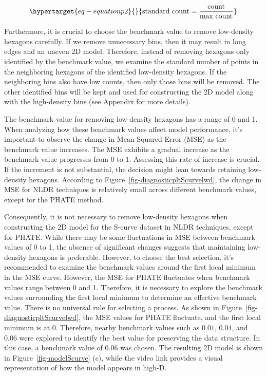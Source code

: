 \documentclass[
  12pt]{article}
\begin{document}
\begin{equation}\protect\hypertarget{eq-equationp2}{}{
\text{standard count} = \frac{\text{count}}{\text{max count}} 
}\label{eq-equationp2}\end{equation}

Furthermore, it is crucial to choose the benchmark value to remove
low-density hexagons carefully. If we remove unnecessary bins, then it
may result in long edges and an uneven 2D model. Therefore, instead of
removing hexagons only identified by the benchmark value, we examine the
standard number of points in the neighboring hexagons of the identified
low-density hexagons. If the neighboring bins also have low counts, then
only those bins will be removed. The other identified bins will be kept
and used for constructing the 2D model along with the high-density bins
(see Appendix for more details).

The benchmark value for removing low-density hexagons has a range of
\(0\) and \(1\). When analyzing how these benchmark values affect model
performance, it's important to observe the change in Mean Squared Error
(MSE) as the benchmark value increases. The MSE exhibits a gradual
increase as the benchmark value progresses from \(0\) to \(1\).
Assessing this rate of increase is crucial. If the increment is not
substantial, the decision might lean towards retaining low-density
hexagons. According to Figure~\ref{fig-diagnosticpltScurvelwd}, the
change in MSE for NLDR techniques is relatively small across different
benchmark values, except for the PHATE method.

Consequently, it is not necessary to remove low-density hexagons when
constructing the 2D model for the S-curve dataset in NLDR techniques,
except for PHATE. While there may be some fluctuations in MSE between
benchmark values of 0 to 1, the absence of significant changes suggests
that maintaining low-density hexagons is preferable. However, to choose
the best selection, it's recommended to examine the benchmark values
around the first local minimum in the MSE curve. However, the MSE for
PHATE fluctuates when benchmark values range between 0 and 1. Therefore,
it is necessary to explore the benchmark values surrounding the first
local minimum to determine an effective benchmark value. There is no
universal rule for selecting a process. As shown in
Figure~\ref{fig-diagnosticpltScurvelwd}, the MSE values for PHATE
fluctuate, and the first local minimum is at \(0\). Therefore, nearby
benchmark values such as \(0.01\), \(0.04\), and \(0.06\) were explored
to identify the best value for preserving the data structure. In this
case, a benchmark value of \(0.06\) was chosen. The resulting 2D model
is shown in Figure~\ref{fig-modelScurve} (c), while the video link
provides a visual representation of how the model appears in high-D.
\end{document}
